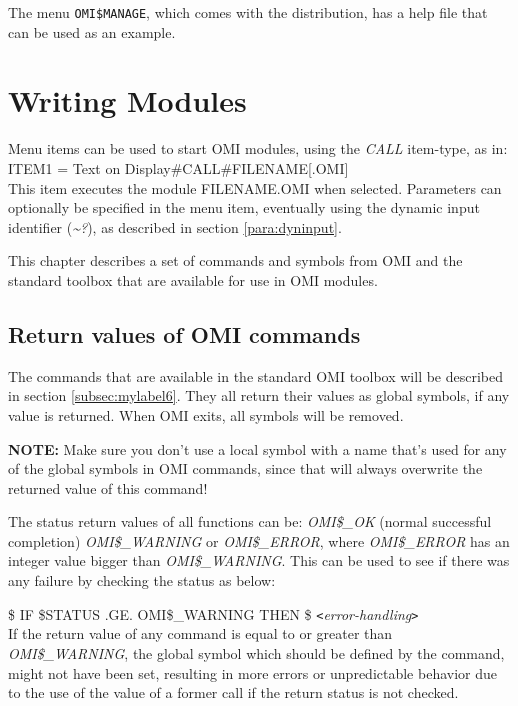 \documentclass[a4paper]{book}
\newcommand{\vs}{\vspace{3mm}}
\newcommand{\lt}{\texttt{<}}
\newcommand{\gt}{\texttt{>}}
\begin{document}
\vs

The menu \texttt{OMI{\$}MANAGE}, which comes with the distribution,
has a help file that can be used as an example.

\chapter{Writing Modules}
\label{sec:writing}

Menu items can be used to start OMI modules, using the \textsl{CALL} item-type, as 
in: \\
\noindent\textsf{ITEM1 = Text on Display{\#}CALL{\#}FILENAME[.OMI]} \\
This item executes the module FILENAME.OMI when selected. Parameters can 
optionally be specified in the menu item, eventually using the dynamic input 
identifier (\textsl{\~{}?}), as described in section \ref{para:dyninput}.

\vs

This chapter describes a set of commands and symbols from OMI and the 
standard toolbox that are available for use in OMI modules.

\section{Return values of OMI commands}
\label{subsec:return}

The commands that are available in the standard OMI toolbox will be 
described in section \ref{subsec:mylabel6}. They all return their values as global symbols, if 
any value is returned. When OMI exits, all symbols will be removed.

\vs

\hspace{-8mm}\textbf{NOTE:} Make sure you don't use a local symbol with a name that's 
used for any of the global symbols in OMI commands, since that will always 
overwrite the returned value of this command!

The status return values of all functions can be:
\textsl{OMI{\$}{\_}OK} (normal successful completion)
\textsl{OMI{\$}{\_}WARNING} or \textsl{OMI{\$}{\_}ERROR}, where 
\textsl{OMI{\$}{\_}ERROR} has an integer value bigger than 
\textsl{OMI{\$}{\_}WARNING}. This can be used to see 
if there was any failure by checking the status as below:

\textsf{{\$} IF {\$}STATUS .GE. OMI{\$}{\_}WARNING THEN {\$} \lt \textit{error-handling}\gt} \\
If the return value of any command is equal to or greater than 
\textsl{OMI{\$}{\_}WARNING}, the global symbol which should be defined by the 
command, might not have been set, resulting in more errors or unpredictable 
behavior due to the use of the value of a former call if the return status 
is not checked.
\end{document}
